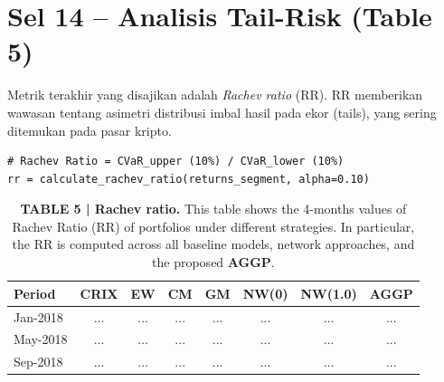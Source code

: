 \documentclass[12pt,a4paper]{article}
\begin{document}
\section{Sel 14 -- Analisis Tail-Risk (Table 5)}
Metrik terakhir yang disajikan adalah \textit{Rachev ratio} (RR). RR memberikan wawasan tentang asimetri distribusi imbal hasil pada ekor (tails), yang sering ditemukan pada pasar kripto.

\begin{lstlisting}[caption={Kalkulasi Rachev Ratio Periodik}]
# Rachev Ratio = CVaR_upper (10%) / CVaR_lower (10%)
rr = calculate_rachev_ratio(returns_segment, alpha=0.10)
\end{lstlisting}

\begin{table}[h]
    \centering
    \footnotesize
    \caption{\textbf{TABLE 5 | Rachev ratio.} This table shows the 4-months values of Rachev Ratio (RR) of portfolios under different strategies. In particular, the RR is computed across all baseline models, network approaches, and the proposed \textbf{AGGP}.}
    \begin{tabular}{lccccccc}
        \toprule
        Period & CRIX & EW & CM & GM & NW(0) & NW(1.0) & AGGP \\
        \midrule
        Jan-2018 & ... & ... & ... & ... & ... & ... & ... \\
        May-2018 & ... & ... & ... & ... & ... & ... & ... \\
        Sep-2018 & ... & ... & ... & ... & ... & ... & ... \\
        \bottomrule
    \end{tabular}
\end{table}

\end{document}
